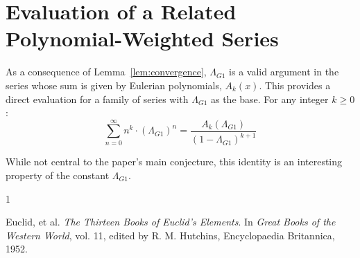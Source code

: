 \documentclass{amsart}
\theoremstyle{plain}
\theoremstyle{definition}
\theoremstyle{remark}
\newcommand{\LambdaG}{\Lambda_{G1}}
\begin{document}
\section{Evaluation of a Related Polynomial-Weighted Series}
As a consequence of Lemma~\ref{lem:convergence}, $\LambdaG$ is a valid argument in the series whose sum is given by Eulerian polynomials, $A_k(x)$.
This provides a direct evaluation for a family of series with $\LambdaG$ as the base.
For any integer $k \ge 0$:
$$ \sum_{n=0}^{\infty} n^k \cdot (\LambdaG)^n = \frac{A_k(\LambdaG)}{(1-\LambdaG)^{k+1}} $$

While not central to the paper's main conjecture, this identity is an interesting property of the constant $\LambdaG$.

\begin{thebibliography}{1}

Euclid, et al. \textit{The Thirteen Books of Euclid's Elements}. In \textit{Great Books of the Western World}, vol. 11, edited by R. M. Hutchins, Encyclopaedia Britannica, 1952. 

\end{thebibliography}
\end{document}
